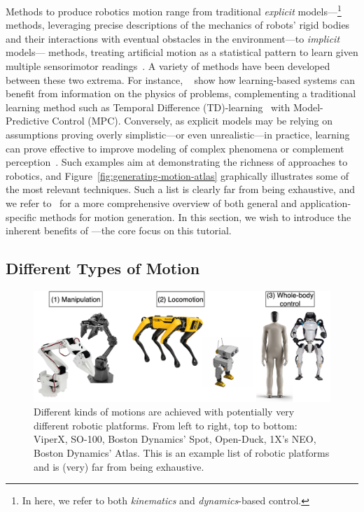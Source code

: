 Methods to produce robotics motion range from traditional \emph{explicit} models---\footnote{In here, we refer to both \emph{kinematics} and \emph{dynamics}-based control.} methods, leveraging precise descriptions of the mechanics of robots' rigid bodies and their interactions with eventual obstacles in the environment---to \emph{implicit} models--- methods, treating artificial motion as a statistical pattern to learn given multiple sensorimotor readings~\citep{agrawalComputationalSensorimotorLearning,bekrisStateRobotMotion2024}.
A variety of methods have been developed between these two extrema.
For instance, ~\citet{hansenTemporalDifferenceLearning2022} show how learning-based systems can benefit from information on the physics of problems, complementing a traditional learning method such as Temporal Difference (TD)-learning~\citet{suttonReinforcementLearningIntroduction2018} with Model-Predictive Control (MPC).
Conversely, as explicit models may be relying on assumptions proving overly simplistic---or even unrealistic---in practice, learning can prove effective to improve modeling of complex phenomena or complement perception~\citep{mccormacSemanticFusionDense3D2016}.
Such examples aim at demonstrating the richness of approaches to robotics, and Figure~\ref{fig:generating-motion-atlas} graphically illustrates some of the most relevant techniques.
Such a list is clearly far from being exhaustive, and we refer to~\citet{bekrisStateRobotMotion2024} for a more comprehensive overview of both general and application-specific methods for motion generation.
In this section, we wish to introduce the inherent benefits of ---the core focus on this tutorial.

\subsection{Different Types of Motion}

\begin{figure}
    \centering
    \includegraphics[width=0.7\linewidth]{figures/ch2/ch2-platforms.pdf}
    \caption{Different kinds of motions are achieved with potentially very different robotic platforms. From left to right, top to bottom: ViperX, SO-100, Boston Dynamics' Spot, Open-Duck, 1X's NEO, Boston Dynamics' Atlas. This is an example list of robotic platforms and is (very) far from being exhaustive.}
    \label{fig:robotics-platforms-atlas}
\end{figure}

